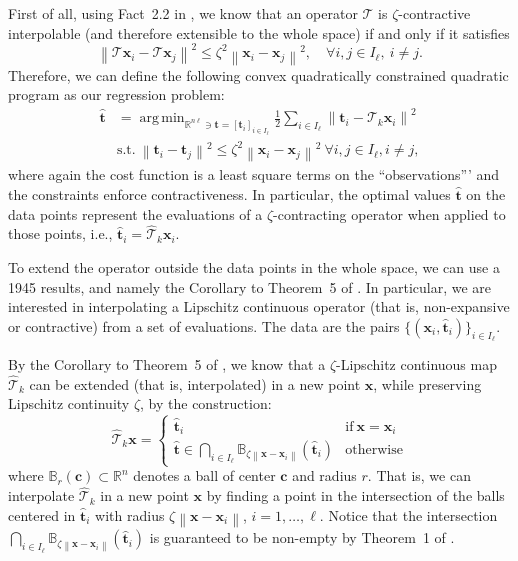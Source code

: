 \documentclass{article}
\DeclareMathOperator*{\argmin}{arg\,min}
\newcommand{\norm}[1]{\left\lVert#1\right\rVert}
\newcommand{\R}{\mathbb{R}}
\newcommand{\tv}{\mathbold{t}}
\newcommand{\x}{\mathbold{x}}
\newcommand{\ball}[2]{\mathbb{B}_{#2}(#1)}
\newcommand{\cv}{\mathbold{c}}
\newcommand{\T}{\mathcal{T}}
\begin{document}
First of all, using Fact~2.2 in \cite{ryu_operator_2020}, we know that an operator $\T$ is $\zeta$-contractive interpolable (and therefore extensible to the whole space) if and only if it satisfies
\begin{equation}
	\norm{\T \x_i - \T \x_j}^2 \leq \zeta^2 \norm{\x_i - \x_j}^2, \quad \forall i,j \in I_{\ell}, \ i \neq j.
\end{equation}
Therefore, we can define the following convex quadratically constrained quadratic program as our regression problem:
\begin{equation}\label{eq:operator-regression}
\begin{split}
	\hat{\tv} &= \argmin_{ \R^{n\ell} \ni \tv = [\tv_i]_{i \in I_{\ell}}} \frac{1}{2} \sum_{i \in I_{\ell}} \norm{\tv_i - \T_k \x_i}^2 \\
	&\text{s.t.} \ \norm{\tv_i - \tv_j}^2 \leq \zeta^2 \norm{\x_i - \x_j}^2 \ \forall i,j \in I_{\ell}, i \neq j,
\end{split}
\end{equation}
where again the cost function is a least square terms on the ``observations''' and the constraints enforce contractiveness. In particular, the optimal values $\hat{\tv}$ on the data points represent the evaluations of a $\zeta$-contracting operator when applied to those points, i.e., $\hat{\tv}_i = \hat{\T}_k\x_i$.  

To extend the operator outside the data points in the whole space, we can use a 1945 results, and namely the Corollary to Theorem~5 of \cite{valentine_lipschitz_1945}. In particular, we are interested in interpolating a Lipschitz continuous operator (that is, non-expansive or contractive) from a set of evaluations. The data are the pairs $\{ (\x_i, \hat{\tv}_i) \}_{i \in I_{\ell}}$.

By the Corollary to Theorem~5 of \cite{valentine_lipschitz_1945}, we know that a $\zeta$-Lipschitz continuous map $\hat{\T}_k$ can be extended (that is, interpolated) in a new point $\x$, while preserving Lipschitz continuity $\zeta$, by the construction:
\begin{equation}\label{eq:interpolation}
	\hat{\T}_k \x = \begin{cases}
		\hat{\tv}_i & \text{if} \ \x = \x_i \\
		\hat{\tv} \in \bigcap_{i \in I_{\ell}} \ball{\hat{\tv}_i}{\zeta \norm{\x - \x_i}} & \text{otherwise}
	\end{cases}
\end{equation}
where $\ball{\cv}{r} \subset \R^n$ denotes a ball of center $\cv$ and radius $r$. That is, we can interpolate $\hat{\T}_k$ in a new point $\x$ by finding a point in the intersection of the balls centered in $\hat{\tv}_i$ with radius $\zeta \norm{\x - \x_i}$, $i = 1, \ldots, \ell$. Notice that the intersection $\bigcap_{i \in I_{\ell}} \ball{\hat{\tv}_i}{\zeta \norm{\x - \x_i}}$ is guaranteed to be non-empty by Theorem~1 of \cite{valentine_lipschitz_1945}.
\end{document}
